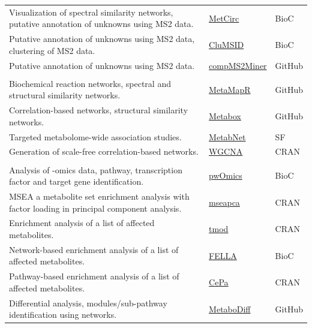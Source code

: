 \documentclass[]{article}
\begin{document}
\begin{longtable}{>{\raggedright\arraybackslash}p{30em}>{\raggedright\arraybackslash}p{10em}>{\raggedright\arraybackslash}p{3em}}
Visualization of spectral similarity networks, putative annotation of unknowns using MS2 data. & \href{https://bioconductor.org/packages/release/bioc/html/MetCirc.html}{MetCirc} & BioC\\
\rowcolor{gray!6}  Putative annotation of unknowns using MS2 data, clustering of MS2 data. & \href{https://bioconductor.org/packages/devel/bioc/html/CluMSID.html}{CluMSID} & BioC\\
Putative annotation of unknowns using MS2 data. & \href{https://github.com/WMBEdmands/compMS2Miner}{compMS2Miner} & GitHub\\
\rowcolor{gray!6}  \addlinespace[0.3em]
\multicolumn{3}{l}{\textbf{Generation of metabolite networks}}\\
Biochemical reaction networks, spectral and structural similarity networks. & \href{http://dgrapov.github.io/MetaMapR/}{MetaMapR} & GitHub\\
Correlation-based networks, structural similarity networks. & \href{http://kwanjeeraw.github.io/metabox/}{Metabox} & GitHub\\
\rowcolor{gray!6}  Targeted metabolome-wide association studies. & \href{https://sourceforge.net/projects/metabnet/}{MetabNet} & SF\\
Generation of scale-free correlation-based networks. & \href{https://cran.r-project.org/package=WGCNA}{WGCNA} & CRAN\\
\rowcolor{gray!6}  \addlinespace[0.3em]
\multicolumn{3}{l}{\textbf{Pathway analysis}}\\
Analysis of -omics data, pathway, transcription factor and target gene identification. & \href{https://doi.org/doi:10.18129/B9.bioc.pwOmics}{pwOmics} & BioC\\
MSEA a metabolite set enrichment analysis with factor loading in principal component analysis. & \href{https://cran.r-project.org/package=mseapca}{mseapca} & CRAN\\
\rowcolor{gray!6}  Enrichment analysis of a list of affected metabolites. & \href{https://cran.r-project.org/package=tmod}{tmod} & CRAN\\
Network-based enrichment analysis of a list of affected metabolites. & \href{https://bioconductor.org/packages/release/bioc/html/FELLA.html}{FELLA} & BioC\\
\rowcolor{gray!6}  Pathway-based enrichment analysis of a list of affected metabolites. & \href{https://cran.r-project.org/package=CePa}{CePa} & CRAN\\
Differential analysis, modules/sub-pathway identification using networks. & \href{https://github.com/andreasmock/MetaboDiff}{MetaboDiff} & GitHub\\

\end{longtable}
\end{document}
